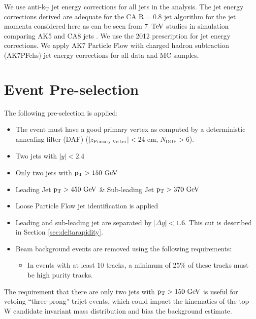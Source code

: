 We use anti-$\mathrm{k_{T}}$ jet energy corrections for all jets in the analysis. 
The jet energy corrections derived are adequate for the CA $\mathrm{R=0.8}$ jet algorithm for the jet momenta
considered here as can be seen from 7~$\mathrm{TeV}$ studies in simulation comparing AK5 and CA8 jets \cite{7tevZprime}.  
We use the 2012 prescription for jet energy corrections\cite{JEC2012}.  We apply AK7 
Particle Flow with charged hadron subtraction 
(AK7PFchs) jet energy corrections for all data and MC samples.

\section{Event Pre-selection}
\label{sec:pre-selection}
The following pre-selection is applied:

\begin{itemize}
\item The event must have a good primary vertex as computed by a deterministic annealing filter (DAF)
($\vert z_\text{Primary Vertex}\vert < 24$ cm, $N_\text{DOF} > 6$).
\item Two jets with $|y| < 2.4$
\item Only two jets with $\mathrm{p_{T}} > 150~\mathrm{GeV}$
\item Leading Jet $\mathrm{p_{T}} > 450~\mathrm{GeV}$ \& Sub-leading Jet $\mathrm{p_{T}} > 370~\mathrm{GeV}$
\item Loose Particle Flow jet identification \cite{jetid} is applied
\item Leading and sub-leading jet are separated by $|\Delta y| < 1.6$.  This cut is described in Section \ref{sec:deltarapidity}.
\item Beam background events are removed using the following requirements:
        \begin{itemize}
        \item In events with at least 10 tracks, a minimum of 25\% of
          these tracks must be high purity tracks.
        \end{itemize}
\end{itemize}


The requirement that there are only two jets with $\mathrm{p_{T}} > 150~\mathrm{GeV}$ is useful for vetoing ``three-prong'' trijet events, which could impact the kinematics of the top-W candidate invariant mass 
distribution and bias the background estimate. 

